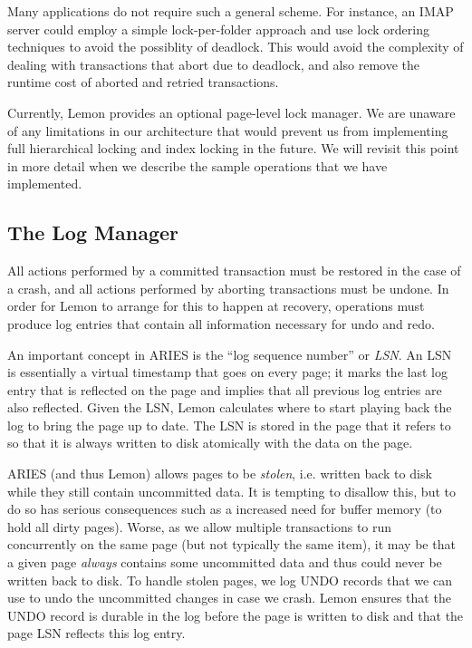 \documentclass[letterpaper,twocolumn,english]{article}
\newcommand{\yad}{Lemon\xspace}
\begin{document}
Many applications do not require such a general scheme.  For instance,
an IMAP server could employ a simple lock-per-folder approach and use
lock ordering techniques to avoid the possiblity of deadlock.  This
would avoid the complexity of dealing with transactions that abort due
to deadlock, and also remove the runtime cost of aborted and retried
transactions.  

Currently, \yad provides an optional page-level lock manager.  We are
unaware of any limitations in our architecture that would prevent us
from implementing full hierarchical locking and index locking in the
future.  We will revisit this point in more detail when we describe
the sample operations that we have implemented.


\subsection{The Log Manager}

All actions performed by a committed transaction must be
restored in the case of a crash, and all actions performed by aborting
transactions must be undone. In order for \yad to arrange for this
to happen at recovery, operations must produce log entries that contain
all information necessary for undo and redo.

An important concept in ARIES is the ``log sequence number'' or {\em
LSN}.  An LSN is essentially a virtual timestamp that goes on every
page; it marks the last log entry that is reflected on the page and
implies that all previous log entries are also reflected.  Given the
LSN, \yad calculates where to start playing back the log to bring the
page up to date.  The LSN is stored in the page that it refers to so
that it is always written to disk atomically with the data on the
page.

ARIES (and thus \yad) allows pages to be {\em stolen}, i.e. written
back to disk while they still contain uncommitted data.  It is
tempting to disallow this, but to do so has serious consequences such as
a increased need for buffer memory (to hold all dirty pages). Worse,
as we allow multiple transactions to run concurrently on the same page
(but not typically the same item), it may be that a given page {\em
always} contains some uncommitted data and thus could never be written
back to disk.  To handle stolen pages, we log UNDO records that
we can use to undo the uncommitted changes in case we crash.  \yad
ensures that the UNDO record is durable in the log before the
page is written to disk and that the page LSN reflects this log entry.
\end{document}
